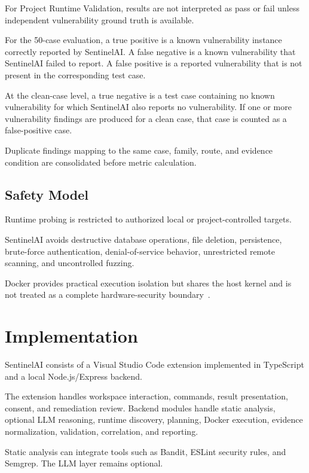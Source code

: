 \documentclass[journal]{IEEEtran}
\begin{document}
For Project Runtime Validation, results are not interpreted as pass or fail
unless independent vulnerability ground truth is available.

For the 50-case evaluation, a true positive is a known vulnerability
instance correctly reported by SentinelAI. A false negative is a known
vulnerability that SentinelAI failed to report. A false positive is a
reported vulnerability that is not present in the corresponding test case.

At the clean-case level, a true negative is a test case containing no known
vulnerability for which SentinelAI also reports no vulnerability. If one or
more vulnerability findings are produced for a clean case, that case is
counted as a false-positive case.

Duplicate findings mapping to the same case, family, route, and evidence
condition are consolidated before metric calculation.

\subsection{Safety Model}

Runtime probing is restricted to authorized local or project-controlled
targets.

SentinelAI avoids destructive database operations, file deletion,
persistence, brute-force authentication, denial-of-service behavior,
unrestricted remote scanning, and uncontrolled fuzzing.

Docker provides practical execution isolation but shares the host kernel and
is not treated as a complete hardware-security boundary~\cite{b9}.

\section{Implementation}

SentinelAI consists of a Visual Studio Code extension implemented in
TypeScript and a local Node.js/Express backend.

The extension handles workspace interaction, commands, result presentation,
consent, and remediation review. Backend modules handle static analysis,
optional LLM reasoning, runtime discovery, planning, Docker execution,
evidence normalization, validation, correlation, and reporting.

Static analysis can integrate tools such as Bandit, ESLint security rules,
and Semgrep. The LLM layer remains optional.
\end{document}
